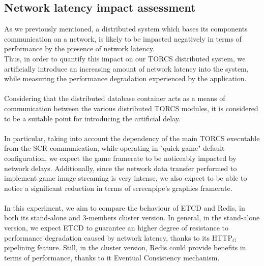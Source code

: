 \subsection{Network latency impact assessment}
As we previously mentioned, a distributed system which bases its components communication on a network, is likely to be impacted negatively in terms of performance by the presence of network latency. \\
Thus, in order to quantify this impact on our TORCS distributed system, we artificially introduce an increasing amount of network latency into the system, while measuring the performance degradation experienced by the application. \\ \\
Considering that the distributed database container acts as a means of communication between the various distributed TORCS modules, it is considered to be a suitable point for introducing the artificial delay. \\ \\
In particular, taking into account the dependency of the main TORCS executable from the SCR communication, while operating in "quick game" default configuration, we expect the game framerate to be noticeably impacted by network delays. Additionally, since the network data transfer performed to implement game image streaming is very intense, we also expect to be able to notice a significant reduction in terms of screenpipe's graphics framerate. \\ \\
In this experiment, we aim to compare the behaviour of ETCD and Redis, in both its stand-alone and 3-members cluster version. In general, in the stand-alone version, we expect ETCD to guarantee an higher degree of resistance to performance degradation caused by network latency, thanks to its HTTP$_G$ pipelining feature. Still, in the cluster version, Redis could provide benefits in terms of performance, thanks to it Eventual Consistency mechanism.


